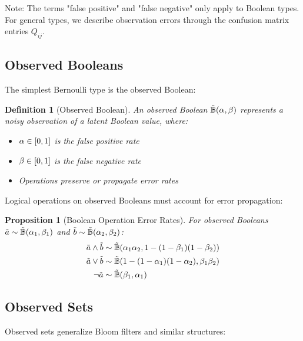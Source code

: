 \documentclass[11pt]{article}
\newtheorem{definition}{Definition}
\newtheorem{proposition}{Proposition}
\begin{document}
Note: The terms "false positive" and "false negative" only apply to Boolean types. For general types, we describe observation errors through the confusion matrix entries $Q_{ij}$.

\subsection{Observed Booleans}

The simplest Bernoulli type is the observed Boolean:

\begin{definition}[Observed Boolean]
An observed Boolean $\tilde{\mathbb{B}}(\alpha, \beta)$ represents a noisy observation of a latent Boolean value, where:
\begin{itemize}
\item $\alpha \in [0,1]$ is the false positive rate
\item $\beta \in [0,1]$ is the false negative rate
\item Operations preserve or propagate error rates
\end{itemize}
\end{definition}

Logical operations on observed Booleans must account for error propagation:

\begin{proposition}[Boolean Operation Error Rates]
For observed Booleans $\tilde{a} \sim \tilde{\mathbb{B}}(\alpha_1, \beta_1)$ and $\tilde{b} \sim \tilde{\mathbb{B}}(\alpha_2, \beta_2)$:
\begin{align}
\tilde{a} \wedge \tilde{b} &\sim \tilde{\mathbb{B}}(\alpha_1\alpha_2, 1-(1-\beta_1)(1-\beta_2)) \\
\tilde{a} \vee \tilde{b} &\sim \tilde{\mathbb{B}}(1-(1-\alpha_1)(1-\alpha_2), \beta_1\beta_2) \\
\neg\tilde{a} &\sim \tilde{\mathbb{B}}(\beta_1, \alpha_1)
\end{align}
\end{proposition}

\subsection{Observed Sets}

Observed sets generalize Bloom filters and similar structures:
\end{document}
